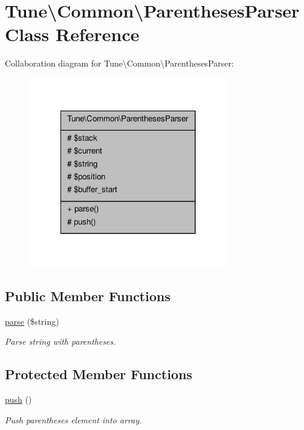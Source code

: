 \hypertarget{classTune_1_1Common_1_1ParenthesesParser}{\section{Tune\textbackslash{}Common\textbackslash{}Parentheses\-Parser Class Reference}
\label{classTune_1_1Common_1_1ParenthesesParser}
}


Collaboration diagram for Tune\textbackslash{}Common\textbackslash{}Parentheses\-Parser\-:
\nopagebreak
\begin{figure}[H]
\begin{center}
\leavevmode
\includegraphics[width=246pt]{classTune_1_1Common_1_1ParenthesesParser__coll__graph}
\end{center}
\end{figure}
\subsection*{Public Member Functions}
\begin{DoxyCompactItemize}
\item 
\hyperlink{classTune_1_1Common_1_1ParenthesesParser_a21b2ef49db8c78bd43c7428265bb3b51}{parse} (\$string)
\begin{DoxyCompactList}\small\item\em Parse string with parentheses. \end{DoxyCompactList}\end{DoxyCompactItemize}
\subsection*{Protected Member Functions}
\begin{DoxyCompactItemize}
\item 
\hyperlink{classTune_1_1Common_1_1ParenthesesParser_a6e4681b3c7c1d5e775410706e9e08bf3}{push} ()
\begin{DoxyCompactList}\small\item\em Push parentheses element into array. \end{DoxyCompactList}\end{DoxyCompactItemize}
